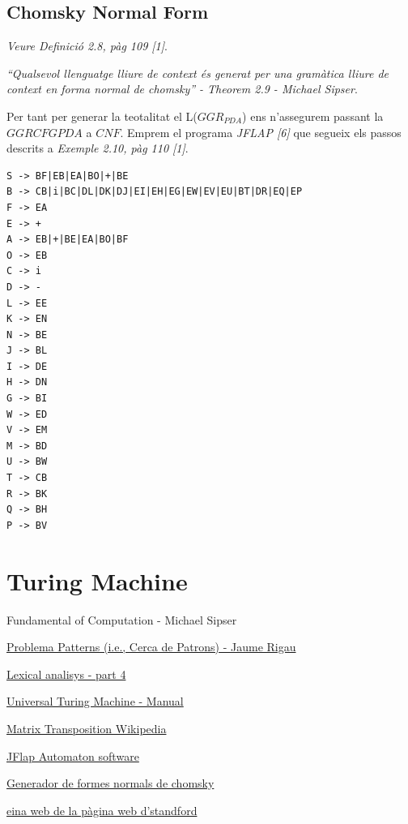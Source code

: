 \documentclass[12pt,a4paper]{report}
\def \pdaCFG{$GGRCFG{PDA} $}
\def \pda{$GGR_{PDA} $}
\begin{document}
\section{Chomsky Normal Form}

\textit{Veure Definició 2.8, pàg 109 [1]}.

\textit{“Qualsevol llenguatge lliure de context és generat per una gramàtica lliure de context en forma normal de chomsky” - Theorem 2.9 - Michael Sipser}.

Per tant per generar la teotalitat el L(\pda{}) ens n’assegurem passant la \pdaCFG{} a $CNF$. Emprem el programa \textit{JFLAP [6]} que segueix els passos descrits a \textit{Exemple 2.10, pàg 110 [1]}.

\begin{lstlisting}
S -> BF|EB|EA|BO|+|BE
B -> CB|i|BC|DL|DK|DJ|EI|EH|EG|EW|EV|EU|BT|DR|EQ|EP
F -> EA
E -> +
A -> EB|+|BE|EA|BO|BF
O -> EB
C -> i
D -> -
L -> EE
K -> EN
N -> BE
J -> BL
I -> DE
H -> DN
G -> BI
W -> ED
V -> EM
M -> BD
U -> BW
T -> CB
R -> BK
Q -> BH
P -> BV
\end{lstlisting}

\clearpage

\chapter{Turing Machine}



\begin{multicols}{2}
\end{multicols}



\begin{thebibliography}{9}
Fundamental of Computation - Michael Sipser

\hyperlink{http://ima.udg.edu/~rigau/FC/FC_patterns.pdf}{Problema Patterns (i.e., Cerca de Patrons) - Jaume Rigau}

\hyperlink{http://ima.udg.edu/~rigau/FC/MFAP.pdf}{Lexical analisys - part 4}

\hyperlink{http://ima.udg.edu/~rigau/FC/utm_read_me.pdf}{Universal Turing Machine - Manual}

\hyperlink{https://en.wikipedia.org/wiki/Transpose}{Matrix Transposition Wikipedia}

\hyperlink{http://www.jflap.org/}{JFlap Automaton software}

\hyperlink{https://mpeveler.com/assets/content/projects/cfg2cnf.php}{Generador de formes normals de chomsky}

\hyperlink{https://web.stanford.edu/class/archive/cs/cs103/cs103.1156/tools/cfg/}{eina web de la pàgina web d’standford}

\end{thebibliography}

\printindex
\end{document}
